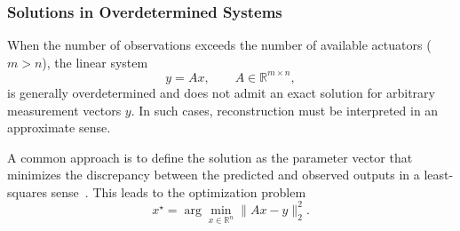 
\subsubsection{Solutions in Overdetermined Systems}

When the number of observations exceeds the number of available actuators ($m > n$), the linear system
\[
y = Ax, \qquad A \in \mathbb{R}^{m \times n},
\]
is generally overdetermined and does not admit an exact solution for arbitrary measurement vectors $y$. In such cases, reconstruction must be interpreted in an approximate sense.


A common approach is to define the solution as the parameter vector that minimizes the discrepancy between the predicted and observed outputs in a least-squares sense~\cite{mueller-2012, burger}. This leads to the optimization problem
\[
x^\star = \arg\min_{x \in \mathbb{R}^n} \|Ax - y\|_2^2.
\]

